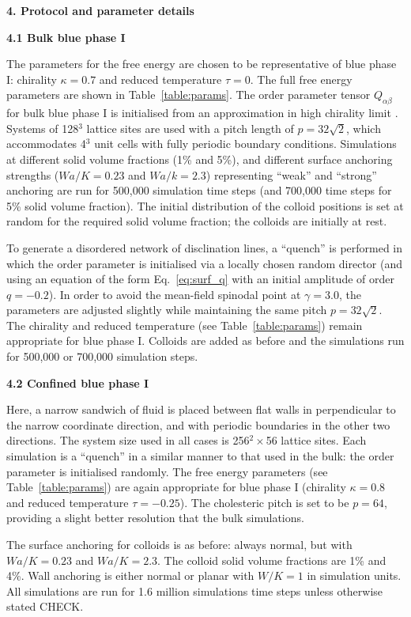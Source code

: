 \documentclass[12pt,twoside]{article}
\begin{document}
{\bf 4. Protocol and parameter details}

{\bf 4.1 Bulk blue phase I}

The parameters for the free energy are chosen to be representative
of blue phase I: chirality $\kappa = 0.7$ and reduced temperature
$\tau = 0$.
The full free energy parameters are shown in Table~\ref{table:params}.
The order parameter tensor $Q_{\alpha\beta}$ for bulk blue phase I is
initialised from an approximation in high chirality limit
\cite{blue1,oliver1}. Systems of 128$^3$ lattice sites are
used with a pitch length of $p = 32\sqrt{2}$, which accommodates 4$^3$
unit cells with fully periodic boundary conditions.
Simulations at different solid volume fractions (1\% and 5\%), and different 
surface anchoring strengths ($Wa/K = 0.23$ and $Wa/k = 2.3$) representing
``weak'' and ``strong'' anchoring are run for 500,000 simulation
time steps (and 700,000 time steps for 5\% solid volume fraction).
The initial distribution of the colloid positions is set at random
for the required solid volume fraction; the colloids are initially
at rest.

To generate a disordered network of disclination lines, a ``quench''
is performed in which the order parameter is initialised via a
locally chosen random director (and using an equation of the form
Eq.~\ref{eq:surf_q} with an initial amplitude of order $q = -0.2$).
In order to avoid the mean-field spinodal point at $\gamma = 3.0$,
the parameters are adjusted slightly while maintaining the same
pitch $p = 32\sqrt{2}$. The chirality and reduced temperature (see
Table~\ref{table:params}) remain appropriate for blue phase I.
Colloids are added as before and the simulations run for 500,000 or 
700,000 simulation steps.

{\bf 4.2 Confined blue phase I}

Here, a narrow sandwich of fluid is placed between flat walls in
perpendicular to the narrow coordinate direction, and with periodic
boundaries in the other two directions. The system size used in all
cases is 256$^2 \times$56 lattice sites. Each simulation is a ``quench''
in a similar manner to that used in the bulk: the order parameter is
initialised randomly. The free energy parameters (see Table~\ref{table:params})
are again appropriate for blue phase I (chirality $\kappa = 0.8$ and
reduced temperature $\tau = -0.25$). The cholesteric pitch is set
to be $p = 64$, providing a slight better resolution that the bulk
simulations.

The surface anchoring for colloids is as before: always normal, but with
$Wa/K = 0.23$ and $Wa/K = 2.3$. The colloid solid volume fractions are
1\% and 4\%. Wall anchoring is either normal or planar with $W/K = 1$
in simulation units. All simulations are run for 1.6 million simulations
time steps unless otherwise stated CHECK.
\end{document}
